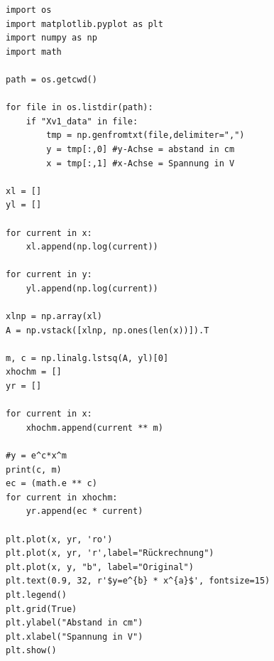 \documentclass[12pt,oneside,a4paper]{report}
\begin{document}
\begin{lstlisting}[style=PYTHON,frame=single,
 caption=Rückrechnung,
 captionpos=b,
 label=lst:RÜCKRECHNUNG]
import os
import matplotlib.pyplot as plt
import numpy as np
import math

path = os.getcwd()

for file in os.listdir(path):
    if "Xv1_data" in file:
        tmp = np.genfromtxt(file,delimiter=",") 
        y = tmp[:,0] #y-Achse = abstand in cm
        x = tmp[:,1] #x-Achse = Spannung in V

xl = []
yl = []

for current in x:
    xl.append(np.log(current))

for current in y:
    yl.append(np.log(current))

xlnp = np.array(xl)
A = np.vstack([xlnp, np.ones(len(x))]).T

m, c = np.linalg.lstsq(A, yl)[0]
xhochm = []
yr = []

for current in x:
    xhochm.append(current ** m)

#y = e^c*x^m
print(c, m)
ec = (math.e ** c)
for current in xhochm:
    yr.append(ec * current)

plt.plot(x, yr, 'ro')
plt.plot(x, yr, 'r',label="Rückrechnung")
plt.plot(x, y, "b", label="Original")
plt.text(0.9, 32, r'$y=e^{b} * x^{a}$', fontsize=15)
plt.legend()
plt.grid(True)
plt.ylabel("Abstand in cm")
plt.xlabel("Spannung in V")
plt.show()
\end{lstlisting}
\newpage
\end{document}
